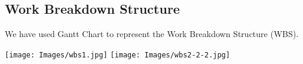 \subsection{Work Breakdown Structure}
\hspace{9mm} We have used Gantt Chart to represent the Work Breakdown Structure (WBS).
\begin{center}
    \texttt{[image: Images/wbs1.jpg]}
    \texttt{[image: Images/wbs2-2-2.jpg]}
\end{center}
